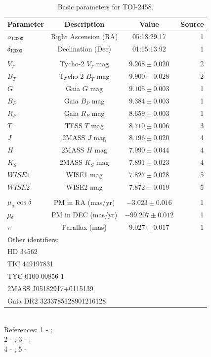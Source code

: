 \documentclass[traditabstract,longauth]{aa}
\begin{document}
\begin{table}
 \centering
 \caption[]{Basic parameters for TOI-2458.}
 \label{tab:basicpar}
 \begin{adjustbox}{width=0.48\textwidth}
    \begin{tabular}{lccr}
        \hline
	\hline
	Parameter & Description & Value & Source\\
        \hline
    $\alpha_{\rm J2000}$ & Right Ascension (RA) & 05:18:29.17 & 1\\
    $\delta_{\rm J2000}$ & Declination (Dec) & 01:15:13.92 & 1\\
    \smallskip\\
    $V_T$ & Tycho-2 $V_T$ mag & $9.268 \pm 0.020$ & 2\\
    $B_T$ & Tycho-2 $B_T$ mag & $9.900 \pm 0.028$ & 2\\
    $G$ & Gaia $G$ mag & $9.105 \pm 0.003$ & 1\\
    $B_P$ & Gaia $B_P$ mag & $9.384 \pm 0.003$ & 1\\
    $R_P$ & Gaia $R_P$ mag & $8.659 \pm 0.003$ & 1\\
    $T$ & TESS $T$ mag & $8.710 \pm 0.006$ & 3\\
    $J$ & 2MASS $J$ mag & $8.196 \pm 0.020$ & 4\\
    $H$ & 2MASS $H$ mag & $7.990 \pm 0.044$ & 4\\
    $K_S$ & 2MASS $K_S$ mag & $7.891 \pm 0.023$ & 4\\
    $WISE1$ & WISE1 mag & $7.827 \pm 0.028$ & 5\\
    $WISE2$ & WISE2 mag & $7.872 \pm 0.019$ & 5\\
    \smallskip\\
    $\mu_\alpha \cos{\delta}$ & PM in RA (mas/yr) & $-3.023 \pm 0.016$ & 1\\
    $\mu_{\rm \delta}$ & PM in DEC (mas/yr) & $-99.207 \pm 0.012$ & 1\\
    $\pi$ & Parallax (mas) & $9.027 \pm 0.017$ & 1\\
    \hline
    \multicolumn{3}{l}{Other identifiers:} \\
    \multicolumn{3}{l}{HD 34562} \\
    \multicolumn{3}{l}{TIC 449197831} \\
    \multicolumn{3}{l}{TYC 0100-00856-1} \\
    \multicolumn{3}{l}{2MASS J05182917+0115139} \\
    \multicolumn{3}{l}{Gaia DR2 3233785128901216128} \\
    \hline
    \hline
    \end{tabular}
    \end{adjustbox}
    \smallskip\\
    References: 1 - \citet{Gaia21}; \\ 2 - \citet{Hog00}; 3 - \citet{Stassun18}; \\ 4 - \citet{Skrutskie06}; 5 - \citet{Wright10}
\end{table}
\end{document}
